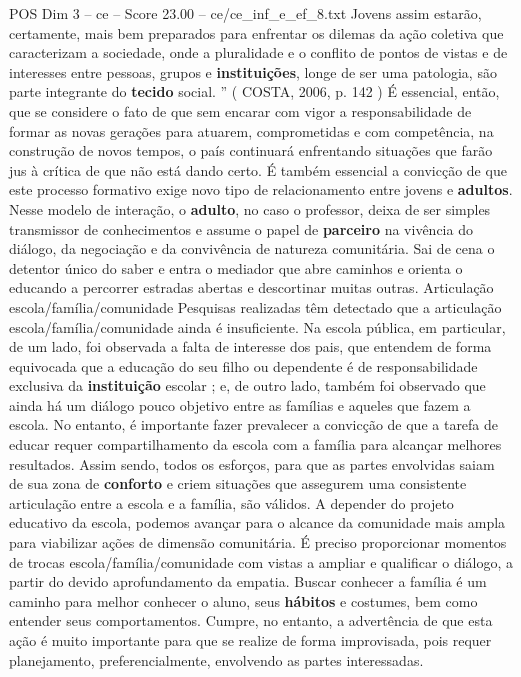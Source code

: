 \begin{textsample}{POS Dim 3 – ce – Score 23.00 – ce/ce\_inf\_e\_ef\_8.txt}
Jovens assim estarão, certamente, mais bem preparados para enfrentar os dilemas da ação coletiva que caracterizam a sociedade, onde a pluralidade e o conflito de pontos de vistas e de interesses entre pessoas, grupos e \textbf{instituições}, longe de ser uma patologia, são parte integrante do \textbf{tecido} social. ” ( COSTA, 2006, p. 142 ) É essencial, então, que se considere o fato de que sem encarar com vigor a responsabilidade de formar as novas gerações para atuarem, comprometidas e com competência, na construção de novos tempos, o país continuará enfrentando situações que farão jus à crítica de que não está dando certo.
É também essencial a convicção de que este processo formativo exige novo tipo de relacionamento entre jovens e \textbf{adultos}.
Nesse modelo de interação, o \textbf{adulto}, no caso o professor, deixa de ser simples transmissor de conhecimentos e assume o papel de \textbf{parceiro} na vivência do diálogo, da negociação e da convivência de natureza comunitária.
Sai de cena o detentor único do saber e entra o mediador que abre caminhos e orienta o educando a percorrer estradas abertas e descortinar muitas outras.
Articulação escola/família/comunidade Pesquisas realizadas têm detectado que a articulação escola/família/comunidade ainda é insuficiente.
Na escola pública, em particular, de um lado, foi observada a falta de interesse dos pais, que entendem de forma equivocada que a educação do seu filho ou dependente é de responsabilidade exclusiva da \textbf{instituição} escolar ; e, de outro lado, também foi observado que ainda há um diálogo pouco objetivo entre as famílias e aqueles que fazem a escola.
No entanto, é importante fazer prevalecer a convicção de que a tarefa de educar requer compartilhamento da escola com a família para alcançar melhores resultados.
Assim sendo, todos os esforços, para que as partes envolvidas saiam de sua zona de \textbf{conforto} e criem situações que assegurem uma consistente articulação entre a escola e a família, são válidos.
A depender do projeto educativo da escola, podemos avançar para o alcance da comunidade mais ampla para viabilizar ações de dimensão comunitária.
É preciso proporcionar momentos de trocas escola/família/comunidade com vistas a ampliar e qualificar o diálogo, a partir do devido aprofundamento da empatia.
Buscar conhecer a família é um caminho para melhor conhecer o aluno, seus \textbf{hábitos} e costumes, bem como entender seus comportamentos.
Cumpre, no entanto, a advertência de que esta ação é muito importante para que se realize de forma improvisada, pois requer planejamento, preferencialmente, envolvendo as partes interessadas.

\end{textsample}

